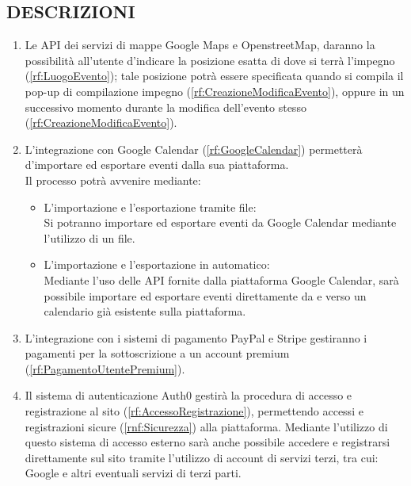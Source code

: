 \subsection*{DESCRIZIONI}
\begin{enumerate}
    \item Le API dei servizi di mappe Google Maps e OpenstreetMap, daranno la possibilità all'utente d'indicare la posizione esatta di dove si terrà l'impegno (\ref{rf:LuogoEvento}); tale posizione potrà essere specificata quando si compila il pop-up di compilazione impegno (\ref{rf:CreazioneModificaEvento}), oppure in un successivo momento durante la modifica dell'evento stesso (\ref{rf:CreazioneModificaEvento}).

    \item L'integrazione con Google Calendar (\ref{rf:GoogleCalendar}) permetterà d'importare ed esportare eventi dalla sua piattaforma.\\
          Il processo potrà avvenire mediante:
          \begin{itemize}
              \item L'importazione e l'esportazione tramite file: \\
                    Si potranno importare ed esportare eventi da Google Calendar mediante l'utilizzo di un file.
              \item L'importazione e l'esportazione in automatico: \\
                    Mediante l'uso delle API fornite dalla piattaforma Google Calendar, sarà possibile importare ed esportare eventi direttamente da e verso un calendario già esistente sulla piattaforma.
          \end{itemize}

    \item L'integrazione con i sistemi di pagamento PayPal e Stripe gestiranno i pagamenti per la sottoscrizione a un account premium (\ref{rf:PagamentoUtentePremium}).

    \item Il sistema di autenticazione Auth0 gestirà la procedura di accesso e registrazione al sito (\ref{rf:AccessoRegistrazione}), permettendo accessi e registrazioni sicure (\ref{rnf:Sicurezza}) alla piattaforma. Mediante l'utilizzo di questo sistema di accesso esterno sarà anche possibile accedere e registrarsi direttamente sul sito tramite l'utilizzo di account di servizi terzi, tra cui: Google e altri eventuali servizi di terzi parti.


\end{enumerate}
